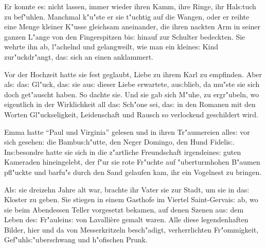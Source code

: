 \documentclass[oneside,12pt]{book}
\newcommand{\s}{s:}%
\begin{document}
Er konnte e{\s} nicht lassen, immer wieder ihren Kamm, ihre Ringe,
ihr Hal{\s}tuch zu bef"uhlen. Manchmal k"u"ste er sie t"uchtig auf
die Wangen, oder er reihte eine Menge kleiner K"usse gleichsam
aneinander, die ihren nackten Arm in seiner ganzen L"ange von den
Fingerspitzen bi{\s} hinauf zur Schulter bedeckten. Sie wehrte ihn
ab, l"achelnd und gelangweilt, wie man ein kleine{\s} Kind
zur"uckdr"angt, da{\s} sich an einen anklammert.

Vor der Hochzeit hatte sie fest geglaubt, Liebe zu ihrem Karl zu
empfinden. Aber al{\s} da{\s} Gl"uck, da{\s} sie au{\s} dieser
Liebe erwartete, au{\s}blieb, da mu"ste sie sich doch get"auscht
haben. So dachte sie. Und sie gab sich M"uhe, zu ergr"ubeln, wo
eigentlich in der Wirklichkeit all da{\s} Sch"one sei, da{\s} in
den Romanen mit den Worten Gl"uckseligkeit, Leidenschaft und
Rausch so verlockend geschildert wird.


\newpage\begin{center}
{\large \so{Se{ch}{st}e{\s} Kapitel}}\bigskip\bigskip
\end{center}

Emma hatte "`Paul und Virginia"' gelesen und in ihren Tr"aumereien
alle{\s} vor sich gesehen: die Bambu{\s}h"utte, den Neger Domingo,
den Hund Fideli{\s}. In{\s}besondre hatte sie sich in die
z"artliche Freundschaft irgendeine{\s} guten Kameraden
hineingelebt, der f"ur sie rote Fr"uchte auf "uberturmhohen
B"aumen pfl"uckte und barfu"s durch den Sand gelaufen kam, ihr ein
Vogelnest zu bringen.

Al{\s} sie dreizehn Jahre alt war, brachte ihr Vater sie zur
Stadt, um sie in da{\s} Kloster zu geben. Sie stiegen in einem
Gasthofe im Viertel Saint-Gervai{\s} ab, wo sie beim Abendessen
Teller vorgesetzt bekamen, auf denen Szenen au{\s} dem Leben
de{\s} Fr"aulein{\s} von Lavalli\`ere gemalt waren. Alle diese
legendenhaften Bilder, hier und da von Messerkritzeln besch"adigt,
verherrlichten Fr"ommigkeit, Gef"uhl{\s}"uberschwang und
h"ofischen Prunk.
\end{document}
